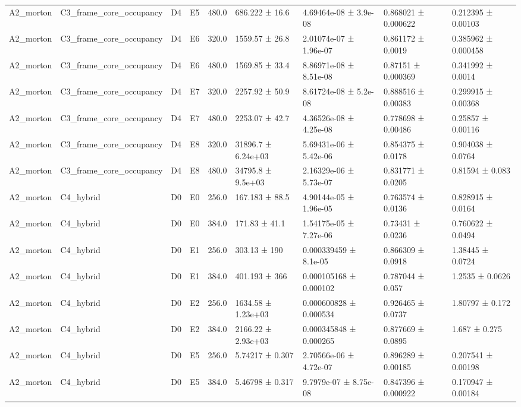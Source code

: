 \begin{table}
\begin{tabular}{lllllllll}
A2\_morton & C3\_frame\_core\_occupancy & D4 & E5 & 480.0 & 686.222 ± 16.6 & 4.69464e-08 ± 3.9e-08 & 0.868021 ± 0.000622 & 0.212395 ± 0.00103 \\
A2\_morton & C3\_frame\_core\_occupancy & D4 & E6 & 320.0 & 1559.57 ± 26.8 & 2.01074e-07 ± 1.96e-07 & 0.861172 ± 0.0019 & 0.385962 ± 0.000458 \\
A2\_morton & C3\_frame\_core\_occupancy & D4 & E6 & 480.0 & 1569.85 ± 33.4 & 8.86971e-08 ± 8.51e-08 & 0.87151 ± 0.000369 & 0.341992 ± 0.0014 \\
A2\_morton & C3\_frame\_core\_occupancy & D4 & E7 & 320.0 & 2257.92 ± 50.9 & 8.61724e-08 ± 5.2e-08 & 0.888516 ± 0.00383 & 0.299915 ± 0.00368 \\
A2\_morton & C3\_frame\_core\_occupancy & D4 & E7 & 480.0 & 2253.07 ± 42.7 & 4.36526e-08 ± 4.25e-08 & 0.778698 ± 0.00486 & 0.25857 ± 0.00116 \\
A2\_morton & C3\_frame\_core\_occupancy & D4 & E8 & 320.0 & 31896.7 ± 6.24e+03 & 5.69431e-06 ± 5.42e-06 & 0.854375 ± 0.0178 & 0.904038 ± 0.0764 \\
A2\_morton & C3\_frame\_core\_occupancy & D4 & E8 & 480.0 & 34795.8 ± 9.5e+03 & 2.16329e-06 ± 5.73e-07 & 0.831771 ± 0.0205 & 0.81594 ± 0.083 \\
A2\_morton & C4\_hybrid & D0 & E0 & 256.0 & 167.183 ± 88.5 & 4.90144e-05 ± 1.96e-05 & 0.763574 ± 0.0136 & 0.828915 ± 0.0164 \\
A2\_morton & C4\_hybrid & D0 & E0 & 384.0 & 171.83 ± 41.1 & 1.54175e-05 ± 7.27e-06 & 0.73431 ± 0.0236 & 0.760622 ± 0.0494 \\
A2\_morton & C4\_hybrid & D0 & E1 & 256.0 & 303.13 ± 190 & 0.000339459 ± 8.1e-05 & 0.866309 ± 0.0918 & 1.38445 ± 0.0724 \\
A2\_morton & C4\_hybrid & D0 & E1 & 384.0 & 401.193 ± 366 & 0.000105168 ± 0.000102 & 0.787044 ± 0.057 & 1.2535 ± 0.0626 \\
A2\_morton & C4\_hybrid & D0 & E2 & 256.0 & 1634.58 ± 1.23e+03 & 0.000600828 ± 0.000534 & 0.926465 ± 0.0737 & 1.80797 ± 0.172 \\
A2\_morton & C4\_hybrid & D0 & E2 & 384.0 & 2166.22 ± 2.93e+03 & 0.000345848 ± 0.000265 & 0.877669 ± 0.0895 & 1.687 ± 0.275 \\
A2\_morton & C4\_hybrid & D0 & E5 & 256.0 & 5.74217 ± 0.307 & 2.70566e-06 ± 4.72e-07 & 0.896289 ± 0.00185 & 0.207541 ± 0.00198 \\
A2\_morton & C4\_hybrid & D0 & E5 & 384.0 & 5.46798 ± 0.317 & 9.7979e-07 ± 8.75e-08 & 0.847396 ± 0.000922 & 0.170947 ± 0.00184 \\

\end{tabular}
\end{table}

